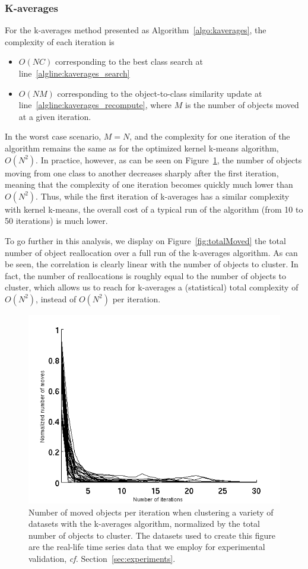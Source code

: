 \documentclass[twoside,11pt]{article}
\begin{document}
\subsubsection{K-averages}

For the k-averages method presented as Algorithm~\ref{algo:kaverages}, the complexity of each iteration is
\begin{itemize}
\item $O(NC)$ corresponding to the best class search at line~\ref{algline:kaverages_search}
\item  $O(NM)$ corresponding to the object-to-class similarity update at line~\ref{algline:kaverages_recompute}, where $M$ is the number of objects moved at a given iteration.
\end{itemize}

In the worst case scenario, $M = N$, and the complexity for one iteration of the algorithm remains the same as for the optimized kernel k-means algorithm, $O(N^2)$. In practice, however, as can be seen on Figure~\ref{fig:moved}, the number of objects moving from one class to another decreases sharply after the first iteration, meaning that the complexity of one iteration becomes quickly much lower than $O(N^2)$. Thus, while the first iteration of k-averages has a similar complexity with kernel k-means, the overall cost of a typical run of the algorithm (from 10 to 50 iterations) is much lower.


To go further in this analysis, we display on Figure~\ref{fig:totalMoved}  the total number of object reallocation over a full run of the k-averages algorithm. As can be seen, the correlation is clearly linear with the number of objects to cluster. In fact, the number of reallocations is roughly equal to the number of objects to cluster, which allows us to reach for k-averages a (statistical) total complexity of $O(N^2)$, instead of $O(N^2)$ per iteration.

\begin{figure}
\center
\includegraphics[width = .65\textwidth]{figures/iterMove.png} 
\caption{Number of moved objects per iteration when clustering a variety of datasets with the k-averages algorithm, normalized by the total number of objects to cluster. The datasets used to create this figure are the real-life time series data that we employ for experimental validation, \textit{cf.} Section~\ref{sec:experiments}.}
\label{fig:moved}
\end{figure}
\end{document}
